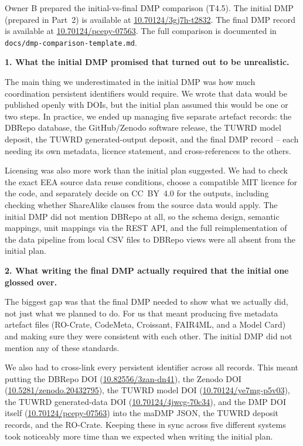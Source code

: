 \documentclass[10pt,a4paper]{article}
\begin{document}
Owner B prepared the initial-vs-final DMP comparison (T4.5). The initial DMP
(prepared in Part~2) is available at
\href{https://handle.test.datacite.org/10.70124/3gj7h-t2832}{10.70124/3gj7h-t2832}.
The final DMP record is available at
\href{https://doi.org/10.70124/pcepy-07563}{10.70124/pcepy-07563}.
The full comparison is documented in \texttt{docs/dmp-comparison-template.md}.

\textbf{1. What the initial DMP promised that turned out to be unrealistic.}

The main thing we underestimated in the initial DMP was how much coordination
persistent identifiers would require. We wrote that data would be published
openly with DOIs, but the initial plan assumed this would be one or two steps.
In practice, we ended up managing five separate artefact records: the DBRepo
database, the GitHub/Zenodo software release, the TUWRD model deposit, the
TUWRD generated-output deposit, and the final DMP record -- each needing its
own metadata, licence statement, and cross-references to the others.

Licensing was also more work than the initial plan suggested. We had to check
the exact EEA source data reuse conditions, choose a compatible MIT licence for
the code, and separately decide on CC~BY~4.0 for the outputs, including checking
whether ShareAlike clauses from the source data would apply. The initial DMP did
not mention DBRepo at all, so the schema design, semantic mappings, unit
mappings via the REST API, and the full reimplementation of the data pipeline
from local CSV files to DBRepo views were all absent from the initial plan.

\textbf{2. What writing the final DMP actually required that the initial one glossed over.}

The biggest gap was that the final DMP needed to show what we actually did,
not just what we planned to do. For us that meant producing five metadata
artefact files (RO-Crate, CodeMeta, Croissant, FAIR4ML, and a Model Card)
and making sure they were consistent with each other. The initial DMP did
not mention any of these standards.

We also had to cross-link every persistent identifier across all records.
This meant putting the DBRepo DOI
(\href{https://doi.org/10.82556/3zan-dn41}{10.82556/3zan-dn41}),
the Zenodo DOI
(\href{https://doi.org/10.5281/zenodo.20432795}{10.5281/zenodo.20432795}),
the TUWRD model DOI
(\href{https://doi.org/10.70124/ye7mg-p5v03}{10.70124/ye7mg-p5v03}),
the TUWRD generated-data DOI
(\href{https://doi.org/10.70124/4jwcg-70c34}{10.70124/4jwcg-70c34}),
and the DMP DOI itself
(\href{https://doi.org/10.70124/pcepy-07563}{10.70124/pcepy-07563})
into the maDMP JSON, the TUWRD deposit records, and the RO-Crate. Keeping
these in sync across five different systems took noticeably more time than
we expected when writing the initial plan.
\end{document}
